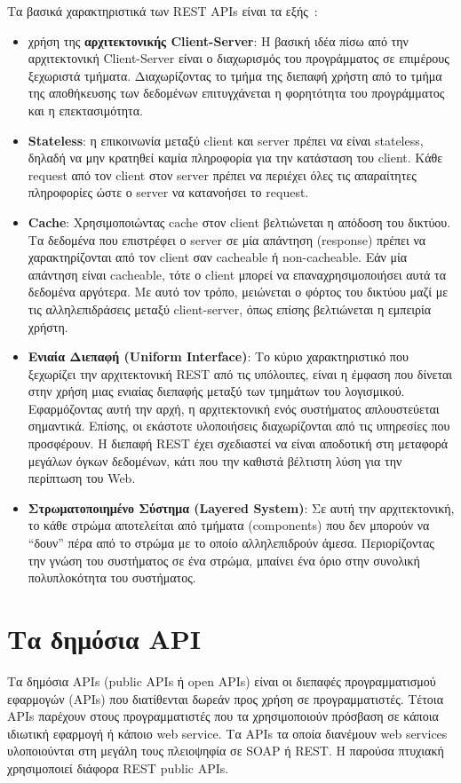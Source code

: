 \documentclass[oneside, 12pt]{book}
\begin{document}
Τα βασικά χαρακτηριστικά των REST APIs είναι τα εξής~\cite{fielding_rest}:
\begin{itemize}
    \item χρήση της \textbf{αρχιτεκτονικής Client-Server}:
    Η βασική ιδέα πίσω από την αρχιτεκτονική Client-Server είναι ο 
    διαχωρισμός του προγράμματος σε επιμέρους ξεχωριστά τμήματα.
    Διαχωρίζοντας το τμήμα της διεπαφή χρήστη από το τμήμα της 
    αποθήκευσης των δεδομένων επιτυγχάνεται η φορητότητα του 
    προγράμματος και η επεκτασιμότητα.
    \item \textbf{Stateless}: η επικοινωνία μεταξύ client και server 
    πρέπει να είναι stateless, δηλαδή να μην κρατηθεί καμία πληροφορία 
    για την κατάσταση του client. Κάθε request από τον client στον 
    server πρέπει να περιέχει όλες τις απαραίτητες πληροφορίες ώστε ο 
    server να κατανοήσει το request.
    \item \textbf{Cache}: Χρησιμοποιώντας cache στον client 
    βελτιώνεται η απόδοση του δικτύου. Τα δεδομένα που επιστρέφει ο 
    server σε μία απάντηση (response) πρέπει να χαρακτηρίζονται από 
    τον client σαν cacheable ή non-cacheable. Εάν μία απάντηση είναι 
    cacheable, τότε ο client μπορεί να επαναχρησιμοποιήσει αυτά τα 
    δεδομένα αργότερα. Με αυτό τον τρόπο, μειώνεται ο φόρτος του 
    δικτύου μαζί με τις αλληλεπιδράσεις μεταξύ client-server, όπως 
    επίσης βελτιώνεται η εμπειρία χρήστη.
    \item \textbf{Ενιαία Διεπαφή (Uniform Interface)}: Το κύριο 
    χαρακτηριστικό που ξεχωρίζει την αρχιτεκτονική REST από τις 
    υπόλοιπες, είναι η έμφαση που δίνεται στην χρήση μιας ενιαίας 
    διεπαφής μεταξύ των τμημάτων του λογισμικού. Εφαρμόζοντας αυτή την 
    αρχή, η αρχιτεκτονική ενός συστήματος απλουστεύεται σημαντικά. 
    Επίσης, οι εκάστοτε υλοποιήσεις διαχωρίζονται από τις υπηρεσίες που 
    προσφέρουν. Η διεπαφή REST έχει σχεδιαστεί να είναι αποδοτική στη 
    μεταφορά μεγάλων όγκων δεδομένων, κάτι που την καθιστά βέλτιστη 
    λύση για την περίπτωση του Web.
    \item \textbf{Στρωματοποιημένο Σύστημα (Layered System)}:
    Σε αυτή την αρχιτεκτονική, το κάθε στρώμα αποτελείται από τμήματα 
    (components) που δεν μπορούν να ``δουν'' πέρα από το στρώμα με το 
    οποίο αλληλεπιδρούν άμεσα. Περιορίζοντας την γνώση του συστήματος 
    σε ένα στρώμα, μπαίνει ένα όριο στην συνολική πολυπλοκότητα του 
    συστήματος.
\end{itemize}


\section{Τα δημόσια API}
Τα δημόσια APIs (public APIs ή open APIs) είναι οι διεπαφές 
προγραμματισμού εφαρμογών (APIs) που διατίθενται δωρεάν προς χρήση σε 
προγραμματιστές.
Τέτοια APIs παρέχουν στους προγραμματιστές που τα χρησιμοποιούν 
πρόσβαση σε κάποια ιδιωτική εφαρμογή ή κάποιο web service.
Τα APIs τα οποία διανέμουν web services υλοποιούνται στη μεγάλη τους 
πλειοψηφία σε SOAP ή REST. Η παρούσα πτυχιακή χρησιμοποιεί διάφορα 
REST public APIs.
\end{document}
